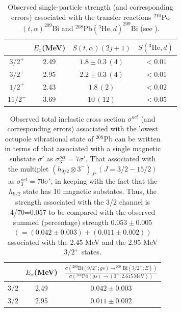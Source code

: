 \begin{table}
	\begin{tabular}{|c|c|c|c|}
		\hline 
		& $E_x$(MeV) & $S(t,\alpha)(2j+1)$ & $S(^3\text{He},d)$ \\
		\hline 
		$3/2^+$ & 2.49 & $1.8\pm0.3\,(4)$  & $<0.01$  \\ 
		$3/2^+$ & 2.95 & $2.2\pm0.3\,(4)$  & $<0.01$ \\ 
		$1/2^+$& 2.43 &  $1.8\,(2)$& $<0.02$ \\ 
		$11/2^-$& 3.69 & $10\,(12)$ &  $<0.05$\\ 
		\hline
	\end{tabular}\caption{Observed single-particle strength (and corresponding errors) associated with the  transfer reactions  $^{210}$Po$(t,\alpha)^{209}$Bi and $^{208}$Pb$(^3\text{He},d)^{209}$Bi (see \cite{Bortignon:77}).}\label{tabintroC1}
\end{table}
\begin{table}
	\begin{tabular}{|c|c|c|}
		\hline 
		& $E_x$(MeV) & $\frac{\sigma\left(^{209}\text{Bi}(9/2^-;gs)\rightarrow^{209}\text{Bi}(3/2^+;E)\right)}{\sigma\left(^{208}\text{Pb}(gs)\rightarrow (3^-;2.615\, \text{MeV})\right)}$  \\
		\hline 
		$3/2$ & 2.49 & $0.042\pm0.003$   \\ 
		$3/2$ & 2.95 & $0.011\pm0.002$  \\ 
		\hline
	\end{tabular}\caption{Observed total inelastic cross section $\sigma^{oct}$ (and corresponding errors) associated with the lowest octupole vibrational state of $^{208}$Pb can be written in terms of that associated with a single magnetic substate $\sigma'$ as $\sigma_{3^-}^{oct}=7\sigma'$. That associated with the multiplet $(h_{9/2}\otimes 3^-)_{J^+} (J=3/2-15/2)$ as $\sigma_{3^-}^{oct}=70\sigma'$, in keeping with the fact that the $h_{9/2}$ state has 10 magnetic substates. Thus, the strength associated with the 3/2 channel is 4/70=0.057 to be compared with the observed summed (percentage) strength $0.053\pm0.005 $ $(=(0.042\pm0.003)+(0.011\pm0.002))$ associated with the 2.45 MeV and the 2.95 MeV $3/2^+$ states.}\label{tabintroC2}
\end{table}
